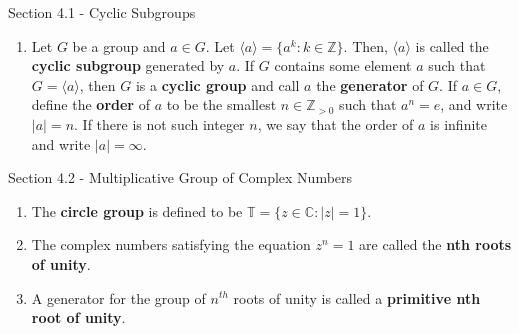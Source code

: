 \documentclass[12pt]{article}
\theoremstyle{definition}
\theoremstyle{named}
\begin{document}
\begin{section}{Section 4.1 - Cyclic Subgroups}
    \begin{enumerate}
        \item Let $G$ be a group and $a \in G$. Let $\langle a \rangle = \{a^k: k \in \mathbb{Z}\}$. Then, $\langle a \rangle$ is called the \textbf{cyclic subgroup} generated by $a$. If $G$ contains some element $a$ such that $G = \langle a \rangle$, then $G$ is a \textbf{cyclic group} and call $a$ the \textbf{generator} of $G$. If $a \in G$, define the \textbf{order} of $a$ to be the smallest $n \in \mathbb{Z}_{>0}$ such that $a^n = e$, and write $|a| = n$. If there is not such integer $n$, we say that the order of $a$ is infinite and write $|a| = \infty$. 
    \end{enumerate}
\end{section}

\begin{section}{Section 4.2 - Multiplicative Group of Complex Numbers}
    \begin{enumerate}
        \item The \textbf{circle group} is defined to be $\mathbb{T} = \{z \in \mathbb{C}: |z|=1\}$. 
        \item The complex numbers satisfying the equation $z^n=1$ are called the \textbf{nth roots of unity}. 
        \item A generator for the group of $n^{th}$ roots of unity is called a \textbf{primitive nth root of unity}. 
    \end{enumerate}
\end{section}
\end{document}
